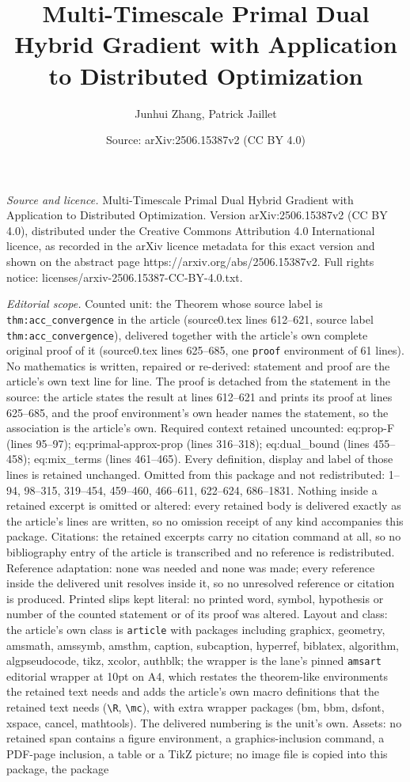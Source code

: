 \documentclass[10pt,a4paper]{amsart}
\title[Multi-Timescale Primal Dual Hybrid Gradient with Application]{Multi-Timescale Primal Dual Hybrid Gradient with Application to Distributed Optimization}
\author{Junhui Zhang, Patrick Jaillet}
\date{Source: arXiv:2506.15387v2 (CC BY 4.0)}
\begin{document}
\maketitle

\noindent\emph{Source and licence.} Multi-Timescale Primal Dual Hybrid Gradient with Application to Distributed Optimization. Version arXiv:2506.15387v2 (CC BY 4.0), distributed under the Creative Commons Attribution 4.0 International licence, as recorded in the arXiv licence metadata for this exact version and shown on the abstract page https://arxiv.org/abs/2506.15387v2. Full rights notice: licenses/arxiv-2506.15387-CC-BY-4.0.txt.\par\smallskip

\noindent\textit{Editorial scope.} Counted unit: the Theorem whose source label is \texttt{thm:acc\_convergence} in the article (source0.tex lines 612--621, source label \texttt{thm:acc\_convergence}), delivered together with the article's own complete original proof of it (source0.tex lines 625--685, one \texttt{proof} environment of 61 lines). No mathematics is written, repaired or re-derived: statement and proof are the article's own text line for line. The proof is detached from the statement in the source: the article states the result at lines 612--621 and prints its proof at lines 625--685, and the proof environment's own header names the statement, so the association is the article's own. Required context retained uncounted: eq:prop-F (lines 95--97); eq:primal-approx-prop (lines 316--318); eq:dual\_bound (lines 455--458); eq:mix\_terms (lines 461--465). Every definition, display and label of those lines is retained unchanged. Omitted from this package and not redistributed: 1--94, 98--315, 319--454, 459--460, 466--611, 622--624, 686--1831. Nothing inside a retained excerpt is omitted or altered: every retained body is delivered exactly as the article's lines are written, so no omission receipt of any kind accompanies this package. Citations: the retained excerpts carry no citation command at all, so no bibliography entry of the article is transcribed and no reference is redistributed. Reference adaptation: none was needed and none was made; every reference inside the delivered unit resolves inside it, so no unresolved reference or citation is produced. Printed slips kept literal: no printed word, symbol, hypothesis or number of the counted statement or of its proof was altered. Layout and class: the article's own class is \texttt{article} with packages including graphicx, geometry, amsmath, amssymb, amsthm, caption, subcaption, hyperref, biblatex, algorithm, algpseudocode, tikz, xcolor, authblk; the wrapper is the lane's pinned \texttt{amsart} editorial wrapper at 10pt on A4, which restates the theorem-like environments the retained text needs and adds the article's own macro definitions that the retained text needs (\texttt{\textbackslash R}, \texttt{\textbackslash mc}), with extra wrapper packages (bm, bbm, dsfont, xspace, cancel, mathtools). The delivered numbering is the unit's own. Assets: no retained span contains a figure environment, a graphics-inclusion command, a PDF-page inclusion, a table or a TikZ picture; no image file is copied into this package, the package 
\end{document}
